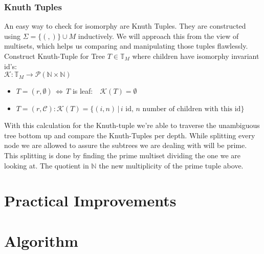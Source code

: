 \documentclass[a4paper,12pt]{article}
\theoremstyle{definition}
\begin{document}
	\subsubsection{Knuth Tuples}
	An easy way to check for isomorphy are Knuth Tuples. They are constructed using $\Sigma =\{(,)\}\cup M$ inductively. We will approach this from the view of multisets, which helps us comparing and manipulating those tuples flawlessly. 
	Construct Knuth-Tuple for Tree $T\in \mathds{T}_M$ where children have isomorphy invariant id's:\\
	$\mathcal{K}: \mathds{T}_M \longrightarrow \mathcal{P}(\mathds{N}\times \mathds{N})$
	\begin{itemize}
		\item $T=(r,\emptyset)\,\Leftrightarrow\, T$  is leaf:$\quad \mathcal{K} (T) =\emptyset$
		\item $T=(r,\mathcal{C}): \mathcal{K}(T)=\{(i, n)\,|\, i \text{ id},\, n \text{ number of children with this id} \}$
	\end{itemize}
	With this calculation for the Knuth-tuple we're able to traverse the unambiguous tree bottom up and compare the Knuth-Tuples per depth. While splitting every node we are allowed to assure the subtrees we are dealing with will be prime. This splitting is done by finding the prime multiset dividing the one we are looking at. The quotient in $\mathds{N}$ the new multiplicity of the prime tuple above.
	\section{Practical Improvements}
	\section{Algorithm}
\end{document}
